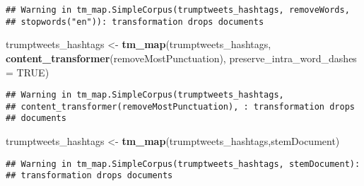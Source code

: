 \documentclass[]{article}
\newenvironment{Shaded}{\begin{snugshade}}{\end{snugshade}}
\newcommand{\KeywordTok}[1]{\textcolor[rgb]{0.13,0.29,0.53}{\textbf{#1}}}
\newcommand{\DataTypeTok}[1]{\textcolor[rgb]{0.13,0.29,0.53}{#1}}
\newcommand{\StringTok}[1]{\textcolor[rgb]{0.31,0.60,0.02}{#1}}
\newcommand{\OtherTok}[1]{\textcolor[rgb]{0.56,0.35,0.01}{#1}}
\newcommand{\NormalTok}[1]{#1}
\begin{document}
\begin{verbatim}
## Warning in tm_map.SimpleCorpus(trumptweets_hashtags, removeWords,
## stopwords("en")): transformation drops documents
\end{verbatim}

\begin{Shaded}
\begin{Highlighting}[]
\NormalTok{trumptweets_hashtags <-}\StringTok{ }\KeywordTok{tm_map}\NormalTok{(trumptweets_hashtags, }\KeywordTok{content_transformer}\NormalTok{(removeMostPunctuation),}
    \DataTypeTok{preserve_intra_word_dashes =} \OtherTok{TRUE}\NormalTok{)}
\end{Highlighting}
\end{Shaded}

\begin{verbatim}
## Warning in tm_map.SimpleCorpus(trumptweets_hashtags,
## content_transformer(removeMostPunctuation), : transformation drops
## documents
\end{verbatim}

\begin{Shaded}
\begin{Highlighting}[]
\NormalTok{trumptweets_hashtags <-}\StringTok{ }\KeywordTok{tm_map}\NormalTok{(trumptweets_hashtags,stemDocument)}
\end{Highlighting}
\end{Shaded}

\begin{verbatim}
## Warning in tm_map.SimpleCorpus(trumptweets_hashtags, stemDocument):
## transformation drops documents
\end{verbatim}
\end{document}
